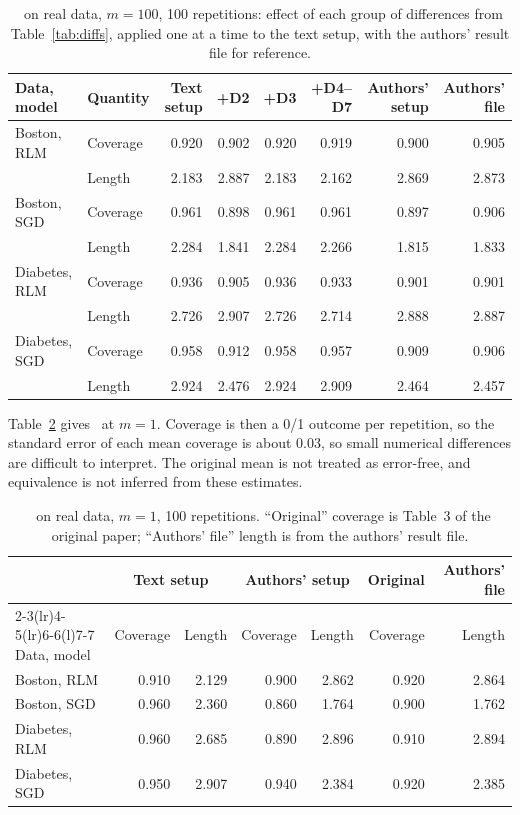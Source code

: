 \begin{table}[htbp]
\centering\footnotesize\setlength{\tabcolsep}{4.5pt}
\caption{\LOO\ on real data, $m=100$, 100 repetitions: effect of each group of differences from
Table~\ref{tab:diffs}, applied one at a time to the text setup, with the authors' result file for reference.}
\label{tab:decomp}
\begin{tabular}{@{}llrrrrrr@{}}
\toprule
Data, model & Quantity & Text setup & +D2 & +D3 & +D4--D7 & Authors' setup & Authors' file \\
\midrule
Boston, RLM & Coverage & 0.920 & 0.902 & 0.920 & 0.919 & 0.900 & 0.905 \\
 & Length & 2.183 & 2.887 & 2.183 & 2.162 & 2.869 & 2.873 \\
\addlinespace
Boston, SGD & Coverage & 0.961 & 0.898 & 0.961 & 0.961 & 0.897 & 0.906 \\
 & Length & 2.284 & 1.841 & 2.284 & 2.266 & 1.815 & 1.833 \\
\addlinespace
Diabetes, RLM & Coverage & 0.936 & 0.905 & 0.936 & 0.933 & 0.901 & 0.901 \\
 & Length & 2.726 & 2.907 & 2.726 & 2.714 & 2.888 & 2.887 \\
\addlinespace
Diabetes, SGD & Coverage & 0.958 & 0.912 & 0.958 & 0.957 & 0.909 & 0.906 \\
 & Length & 2.924 & 2.476 & 2.924 & 2.909 & 2.464 & 2.457 \\
\bottomrule
\end{tabular}
\end{table}

Table~\ref{tab:m1} gives \LOO\ at $m=1$. Coverage is then a 0/1 outcome per repetition, so the standard error of each
mean coverage is about 0.03, so small numerical differences are difficult to interpret. The original mean is not treated as error-free, and equivalence is not inferred from these estimates.

\begin{table}[htbp]
\centering\small
\caption{\LOO\ on real data, $m=1$, 100 repetitions. ``Original'' coverage is Table~3 of the original paper;
``Authors' file'' length is from the authors' result file.}
\label{tab:m1}
\begin{tabular}{@{}lrrrrrr@{}}
\toprule
& \multicolumn{2}{c}{Text setup} & \multicolumn{2}{c}{Authors' setup} & Original & Authors' file \\
\cmidrule(lr){2-3}\cmidrule(lr){4-5}\cmidrule(lr){6-6}\cmidrule(l){7-7}
Data, model & Coverage & Length & Coverage & Length & Coverage & Length \\
\midrule
Boston, RLM & 0.910 & 2.129 & 0.900 & 2.862 & 0.920 & 2.864 \\
Boston, SGD & 0.960 & 2.360 & 0.860 & 1.764 & 0.900 & 1.762 \\
Diabetes, RLM & 0.960 & 2.685 & 0.890 & 2.896 & 0.910 & 2.894 \\
Diabetes, SGD & 0.950 & 2.907 & 0.940 & 2.384 & 0.920 & 2.385 \\
\bottomrule
\end{tabular}
\end{table}

